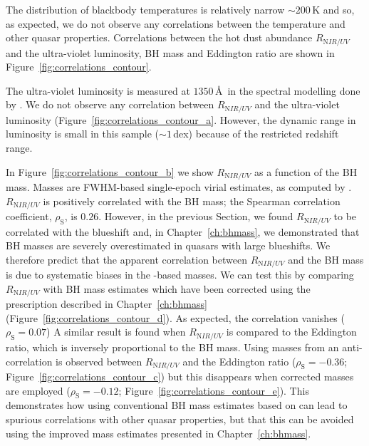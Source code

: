 The distribution of blackbody temperatures is relatively narrow $\sim200$\,K and so, as expected, we do not observe any correlations between the temperature and other quasar properties. 
Correlations between the hot dust abundance $R_{\mathrm NIR/UV}$ and the ultra-violet luminosity, BH mass and Eddington ratio are shown in Figure~\ref{fig:correlations_contour}. 

The ultra-violet luminosity is measured at $1350$\,\AA\, in the spectral modelling done by \citet{shen11}. 
We do not observe any correlation between $R_{\mathrm NIR/UV}$ and the ultra-violet luminosity (Figure~\ref{fig:correlations_contour_a}. 
However, the dynamic range in luminosity is small in this sample ($\sim1$\,dex) because of the restricted redshift range. 

In Figure~\ref{fig:correlations_contour_b} we show $R_{\mathrm NIR/UV}$ as a function of the BH mass. 
Masses are  FWHM-based single-epoch virial estimates, as computed by \citet{shen11}. 
$R_{\mathrm NIR/UV}$ is positively correlated with the BH mass; the Spearman correlation coefficient, $\rho_{\mathrm S}$, is $0.26$. 
However, in the previous Section, we found $R_{\mathrm NIR/UV}$ to be correlated with the  blueshift and, in Chapter~\ref{ch:bhmass}, we demonstrated that BH masses are severely overestimated in quasars with large  blueshifts.
We therefore predict that the apparent correlation between $R_{\mathrm NIR/UV}$ and the BH mass is due to systematic biases in the -based masses. 
We can test this by comparing $R_{\mathrm NIR/UV}$ with BH mass estimates which have been corrected using the prescription described in Chapter~\ref{ch:bhmass} (Figure~\ref{fig:correlations_contour_d}). 
As expected, the correlation vanishes ($\rho_{\mathrm S}=0.07$)
A similar result is found when $R_{\mathrm NIR/UV}$ is compared to the Eddington ratio, which is inversely proportional to the BH mass.  
Using masses from \citet{shen11} an anti-correlation is observed between $R_{\mathrm NIR/UV}$ and the Eddington ratio ($\rho_{\mathrm S}=-0.36$; Figure~\ref{fig:correlations_contour_c}) but this disappears when corrected masses are employed ($\rho_{\mathrm S}=-0.12$; Figure~\ref{fig:correlations_contour_e}). 
This demonstrates how using conventional BH mass estimates based on  can lead to spurious correlations with other quasar properties, but that this can be avoided using the improved mass estimates presented in Chapter~\ref{ch:bhmass}. 

